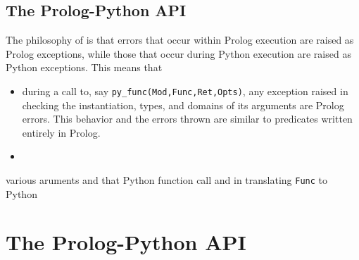\subsection{The Prolog-Python API}

The philosophy of \janusplg{} is that errors that occur within Prolog
execution are raised as Prolog exceptions, while those that occur
during Python execution are raised as Python exceptions.  This means
that
\begin{itemize}
  \item during a call to, say {\tt py\_func(Mod,Func,Ret,Opts)}, any
    exception raised in checking the instantiation, types, and domains
    of its arguments are Prolog errors.  This behavior and the errors
    thrown are similar to predicates written entirely in Prolog.
  \item 
\end{itemize}

various aruments and that Python
function call and in translating {\tt Func} to Python

\section{The Prolog-Python API}

